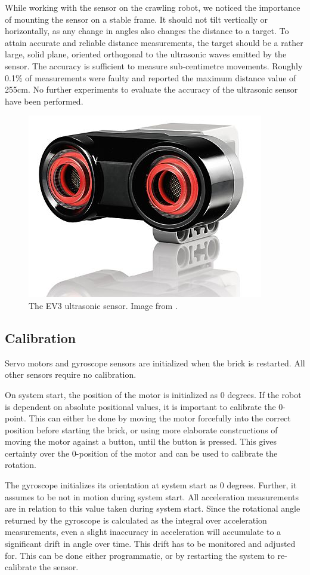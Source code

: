 \documentclass[11pt, a4paper]{article}
\begin{document}
While working with the sensor on the crawling robot, we noticed the importance of mounting the sensor on a stable frame. It should not tilt vertically or horizontally, as any change in angles also changes the distance to a target. To attain accurate and reliable distance measurements, the target should be a rather large, solid plane, oriented orthogonal to the ultrasonic waves emitted by the sensor. The accuracy is sufficient to measure sub-centimetre movements. Roughly 0.1\% of measurements were faulty and reported the maximum distance value of 255cm. No further experiments to evaluate the accuracy of the ultrasonic sensor have been performed.

\begin{figure}[H]
	\centering
	\includegraphics[width=0.3\linewidth]{images/ultrasonic}
	\caption{The EV3 ultrasonic sensor. Image from \cite{ultraosnic_sensor}.}
	\label{fig:ultrasonic}
\end{figure}

\subsection{Calibration} \label{calibration}
Servo motors and gyroscope sensors are initialized when the brick is restarted. All other sensors require no calibration.

On system start, the position of the motor is initialized as 0 degrees. If the robot is dependent on absolute positional values, it is important to calibrate the 0-point. This can either be done by moving the motor forcefully into the correct position before starting the brick, or using more elaborate constructions of moving the motor against a button, until the button is pressed. This gives certainty over the 0-position of the motor and can be used to calibrate the rotation.

The gyroscope initializes its orientation at system start as 0 degrees. Further, it assumes to be not in motion during system start. All acceleration measurements are in relation to this value taken during system start. Since the rotational angle returned by the gyroscope is calculated as the integral over acceleration measurements, even a slight inaccuracy in acceleration will accumulate to a significant drift in angle over time. This drift has to be monitored and adjusted for. This can be done either programmatic, or by restarting the system to re-calibrate the sensor.
\end{document}
